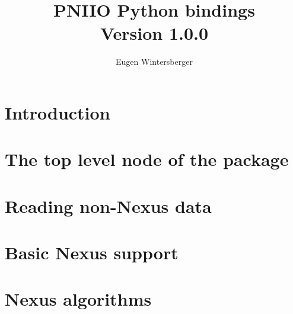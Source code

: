 \documentclass{scrbook}
\title{{\Huge PNIIO Python bindings}\\
       Version 1.0.0}
\author{Eugen Wintersberger}
\begin{document}
\maketitle
\tableofcontents
\listoftodos

\chapter{Introduction}


\chapter{The top level node of the package}


\chapter{Reading non-Nexus data}

\chapter{Basic Nexus support}


\chapter{Nexus algorithms}
\end{document}

